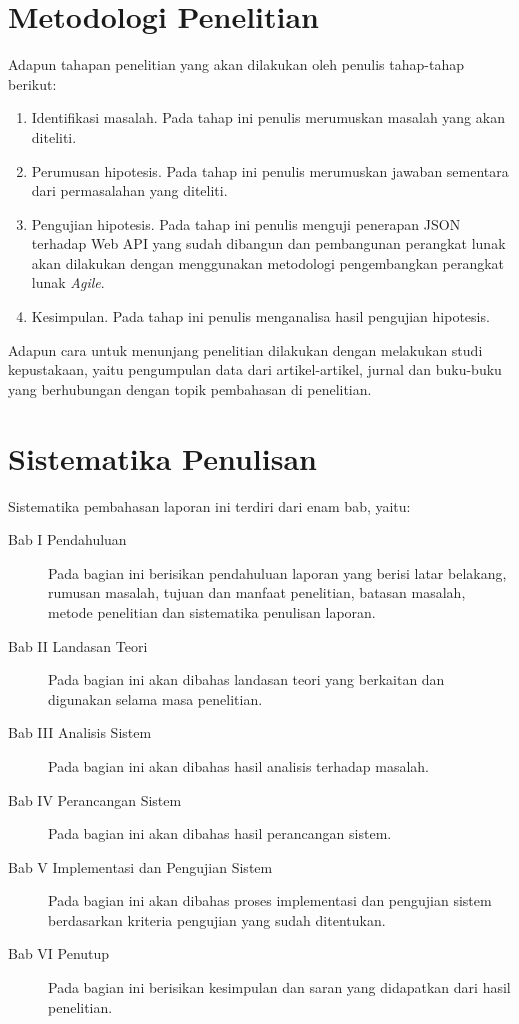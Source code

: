 \documentclass[a4paper, 12pt, oneside]{report}
\begin{document}
\section{Metodologi Penelitian}
\onehalfspacing Adapun tahapan penelitian yang akan dilakukan oleh penulis tahap-tahap berikut:
\begin{enumerate}
  \item Identifikasi masalah. Pada tahap ini penulis merumuskan masalah yang akan diteliti.
  \item Perumusan hipotesis. Pada tahap ini penulis merumuskan jawaban sementara dari permasalahan yang diteliti.
  \item Pengujian hipotesis. Pada tahap ini penulis menguji penerapan JSON terhadap Web API yang sudah dibangun dan pembangunan perangkat lunak akan dilakukan dengan menggunakan metodologi pengembangkan perangkat lunak \textit{Agile}. 
  \item Kesimpulan. Pada tahap ini penulis menganalisa hasil pengujian hipotesis.
\end{enumerate}

\onehalfspacing Adapun cara untuk menunjang penelitian dilakukan dengan melakukan studi kepustakaan, yaitu pengumpulan data dari artikel-artikel, jurnal dan buku-buku yang berhubungan dengan topik pembahasan di penelitian.

\section{Sistematika Penulisan}
Sistematika pembahasan laporan ini terdiri dari enam bab, yaitu:
\begin{description}
  \item[Bab I Pendahuluan] Pada bagian ini berisikan pendahuluan laporan yang berisi latar belakang, rumusan masalah, tujuan dan manfaat penelitian, batasan masalah, metode penelitian dan sistematika penulisan laporan.
  \item[Bab II Landasan Teori] Pada bagian ini akan dibahas landasan teori yang berkaitan dan digunakan selama masa penelitian.
  \item[Bab III Analisis Sistem] Pada bagian ini akan dibahas hasil analisis terhadap masalah.
  \item[Bab IV Perancangan Sistem] Pada bagian ini akan dibahas hasil perancangan sistem.
  \item[Bab V Implementasi dan Pengujian Sistem] Pada bagian ini akan dibahas proses implementasi dan pengujian sistem berdasarkan kriteria pengujian yang sudah ditentukan.
  \item[Bab VI Penutup] Pada bagian ini berisikan kesimpulan dan saran yang didapatkan dari hasil penelitian.
\end{description}
\end{document}
